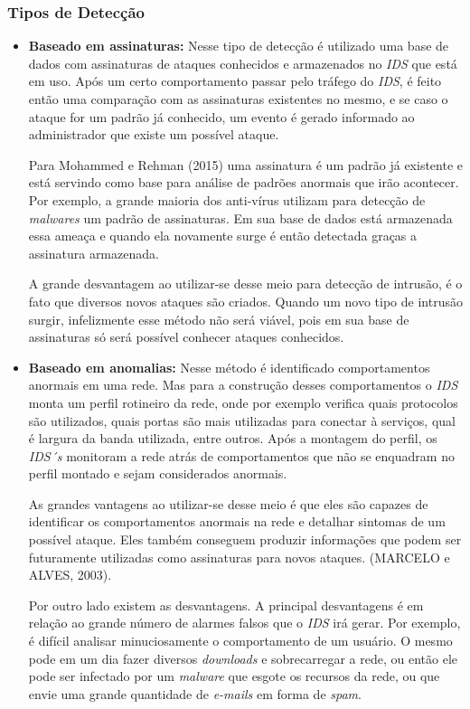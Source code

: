 \subsubsection{Tipos de Detecção}
\begin{itemize}
\item \textbf{Baseado em assinaturas:} Nesse tipo de detecção é utilizado uma base de dados com assinaturas de ataques conhecidos e armazenados no \textit{IDS} que está em uso. Após um certo comportamento passar pelo tráfego do \textit{IDS}, é feito então uma comparação com as assinaturas existentes no mesmo, e se caso o ataque for um padrão já conhecido, um evento é gerado informado ao administrador que existe um possível ataque.

Para Mohammed e Rehman (2015) uma assinatura é um padrão já existente e está servindo como base para análise de padrões anormais que irão acontecer. Por exemplo, a grande maioria dos anti-vírus utilizam para detecção de \textit{malwares} um padrão de assinaturas. Em sua base de dados está armazenada essa ameaça e quando ela novamente surge é então detectada graças a assinatura armazenada.

A grande desvantagem ao utilizar-se desse meio para detecção de intrusão, é o fato que diversos novos ataques são criados. Quando um novo tipo de intrusão surgir, infelizmente esse método não será viável, pois em sua base de assinaturas só será possível conhecer ataques conhecidos.

\item \textbf{Baseado em anomalias:} Nesse método é identificado comportamentos anormais em uma rede. Mas para a construção desses comportamentos o \textit{IDS} monta um perfil rotineiro da rede, onde por exemplo verifica quais protocolos são utilizados, quais portas são mais utilizadas para conectar à serviços, qual é largura da banda utilizada, entre outros. Após a montagem do perfil, os \textit{IDS´s} monitoram a rede atrás de comportamentos que não se enquadram no perfil montado e sejam considerados anormais. 

As grandes vantagens ao utilizar-se desse meio é que eles são capazes de identificar os comportamentos anormais na rede e detalhar sintomas de um possível ataque. Eles também conseguem produzir informações que podem ser futuramente utilizadas como assinaturas para novos ataques. (MARCELO e ALVES, 2003).

Por outro lado existem as desvantagens. A principal desvantagens é em relação ao grande número de alarmes falsos que o \textit{IDS} irá gerar. Por exemplo, é difícil analisar minuciosamente o comportamento de um usuário. O mesmo pode em um dia fazer diversos \textit{downloads} e sobrecarregar a rede, ou então ele pode ser infectado por um \textit{malware} que esgote os recursos da rede, ou que envie uma grande quantidade de \textit{e-mails} em forma de \textit{spam}.
\end{itemize}

